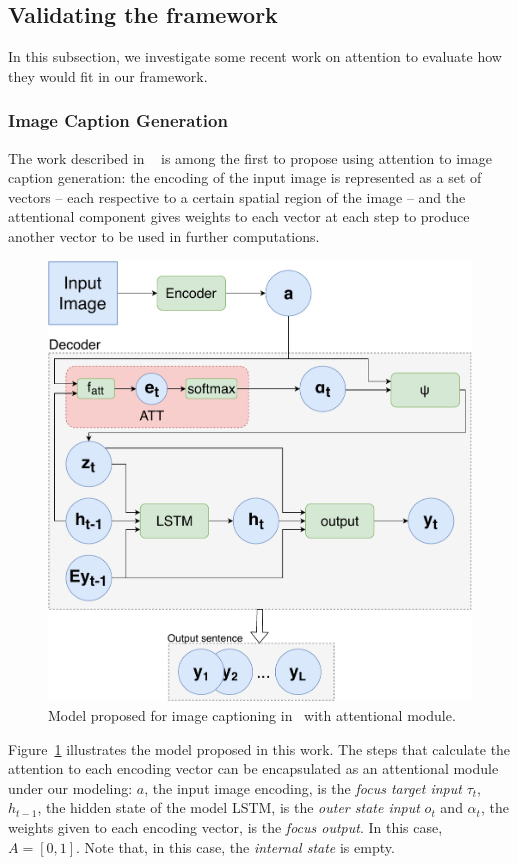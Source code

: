 \documentclass[12pt]{article}
\begin{document}
\subsection{Validating the framework}
In this subsection, we investigate some recent work on attention to evaluate how they would fit in our framework.

\subsubsection{Image Caption Generation}
The work described in ~\cite{ref:show-attend-tell} is among the first to propose using
attention to image caption generation: the encoding of the input image is
represented as a set of vectors -- each respective to a certain spatial region of the image --
and the attentional component gives weights to each vector at each step to produce another
vector to be used in further computations.

\begin{figure}[H]
    \centering
    \includegraphics[width=0.6\linewidth]{./img/captioning.pdf}
    \caption{Model proposed for image captioning in~\cite{ref:show-attend-tell} with attentional module.}
\label{fig:cap}
\end{figure}

Figure~\ref{fig:cap} illustrates the model proposed in this work.
The steps that calculate the attention to each encoding vector can be encapsulated as an attentional module under our modeling:
$a$, the input image encoding, is the \emph{focus target input} $\tau_t$,
$h_{t-1}$, the hidden state of the model LSTM, is the \emph{outer state input} $o_t$
and $\alpha_t$, the weights given to each encoding vector, is the \emph{focus output}. In this case, $A = [0, 1]$.
Note that, in this case, the \emph{internal state} is empty.
\end{document}
